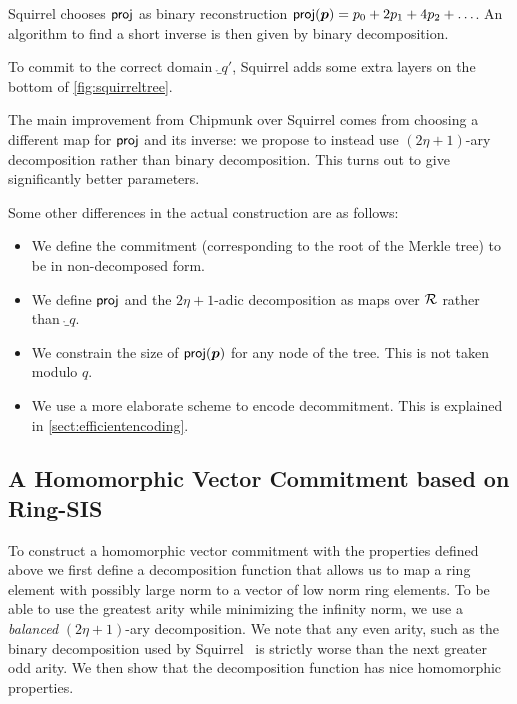 Squirrel chooses $\mathsf{proj}$ as binary reconstruction $\mathsf{proj}(\boldsymbol{p}) = p_0 + 2p_1 + 4p_2 + \ldots$.
An algorithm to find a short inverse is then given by binary decomposition.

To commit to the correct domain $\ring_{q'}$, Squirrel adds some extra layers on the bottom of \autoref{fig:squirreltree}.

The main improvement from Chipmunk over Squirrel comes from choosing a different map for $\mathsf{proj}$ and its inverse: we propose to instead use $(2\eta+1)$-ary decomposition rather than binary decomposition.
This turns out to give significantly better parameters.

Some other differences in the actual construction are as follows:
\begin{itemize}
 \item We define the commitment (corresponding to the root of the Merkle tree) to be in non-decomposed form.
 \item We define $\mathsf{proj}$ and the $2\eta+1$-adic decomposition as maps over $\mathcal{R}$ rather than $\ring_q$.
 \item We constrain the size of $\mathsf{proj}(\boldsymbol{p})$ for any node of the tree. This is not taken modulo $q$.
 \item We use a more elaborate scheme to encode decommitment. This is explained in \autoref{sect:efficientencoding}.
\end{itemize}

\subsection{A Homomorphic Vector Commitment based on Ring-SIS}
To construct a homomorphic vector commitment with the properties defined above we first define a decomposition function that allows us to map a ring element with possibly large norm to a vector of low norm ring elements.
To be able to use the greatest arity while minimizing the infinity norm, we use a \emph{balanced} $(2\eta+1)$-ary decomposition.
We note that any even arity, such as the binary decomposition used by Squirrel~\cite{CCS:FleSimZha22} is strictly worse than the next greater odd arity.
We then show that the decomposition function has nice homomorphic properties. 

